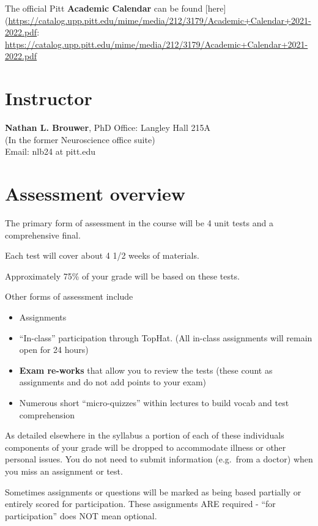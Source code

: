 \documentclass[
]{book}
\providecommand{\tightlist}{%
  \setlength{\itemsep}{0pt}\setlength{\parskip}{0pt}}
\begin{document}
The official Pitt \textbf{Academic Calendar} can be found {[}here{]}(\url{https://catalog.upp.pitt.edu/mime/media/212/3179/Academic+Calendar+2021-2022.pdf}: \url{https://catalog.upp.pitt.edu/mime/media/212/3179/Academic+Calendar+2021-2022.pdf}

\hypertarget{nlb}{%
\chapter{Instructor}\label{nlb}}

\textbf{Nathan L. Brouwer}, PhD
Office: Langley Hall 215A\\
(In the former Neuroscience office suite)\\
Email: nlb24 at pitt.edu

\hypertarget{assessment-overview}{%
\chapter{Assessment overview}\label{assessment-overview}}

The primary form of assessment in the course will be 4 unit tests and a comprehensive final.

Each test will cover about 4 1/2 weeks of materials.

Approximately 75\% of your grade will be based on these tests.

Other forms of assessment include

\begin{itemize}
\tightlist
\item
  Assignments
\item
  ``In-class'' participation through TopHat. (All in-class assignments will remain open for 24 hours)
\item
  \textbf{Exam re-works} that allow you to review the tests (these count as assignments and do not add points to your exam)
\item
  Numerous short ``micro-quizzes'' within lectures to build vocab and test comprehension
\end{itemize}

As detailed elsewhere in the syllabus a portion of each of these individuals components of your grade will be dropped to accommodate illness or other personal issues. You do not need to submit information (e.g.~from a doctor) when you miss an assignment or test.

Sometimes assignments or questions will be marked as being based partially or entirely scored for participation. These assignments ARE required - ``for participation'' does NOT mean optional.
\end{document}
